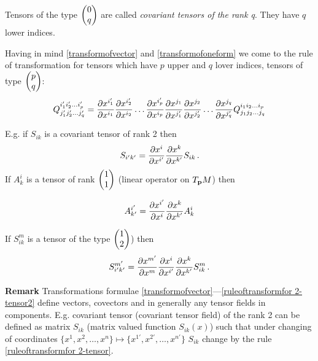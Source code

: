 \documentclass[12pt]{article}
\theoremstyle{theorem}
\numberwithin{equation}{section}
\begin{document}
Tensors of the type $\begin{pmatrix} 0\cr q\cr\end{pmatrix}$ are called
{\it covariant tensors of the rank q}.
They have $q$ lower indices.

Having in mind \eqref{transformofvector} and
\eqref{transformofoneform} we come  to
the rule of transformation for tensors
which have $p$ upper and $q$ lover indices, tensors
of type  $\begin{pmatrix} p\cr q\cr\end{pmatrix}$:
\begin{equation}\label{ruleoftransformationofarbitrarytensors}
    Q^{i'_1i'_2\dots i'_p}_{j'_1j'_2\dots j'_q}=
    {\partial x^{i'_1}\over \partial x^{i_1}}
    {\partial x^{i'_2}\over \partial x^{i_2}}
    \dots
    {\partial x^{i'_p}\over \partial x^{i_p}}
    {\partial x^{j_1}\over \partial x^{j'_1}}
    {\partial x^{j_2}\over \partial x^{j'_2}}
    \dots
    {\partial x^{j_q}\over \partial x^{j'_q}}
    Q^{i_1i_2\dots i_p}_{j_1j_2\dots j_q}
\end{equation}



E.g. if $S_{ik}$ is a covariant tensor
of rank 2 then
            \begin{equation*}\label{ruleoftransformfor 2-tensor}
                S_{i'k'}=
   {\partial x^i\over \partial x^{i'}}
   {\partial x^k\over \partial x^{k'}}
             S_{ik}\,.
            \end{equation*}
 If $A^i_k$ is a tensor of rank $\begin{pmatrix} 1\cr 1\cr\end{pmatrix}$ (linear operator on $T_{\bf p} M$)
 then

             $$
    A^{i'}_{k'}=        {\partial x^{i'}\over \partial x^{i}}{\partial x^k\over \partial x^{k'}}A^i_k
             $$

If $S^m_{ik}$ is a
tensor of the type $\begin{pmatrix} 1\cr 2\cr\end{pmatrix}$) then
            \begin{equation}\label{ruleoftransformfor 2-tensor2}
                S^{m'}_{i'k'}=
   {\partial x^{m'}\over \partial x^m}
   {\partial x^i\over \partial x^{i'}}
   {\partial x^k\over \partial x^{k'}}
             S^{m}_{ik}\,.
            \end{equation}





{\bf Remark} Transformations formulae
\eqref{transformofvector}---\eqref{ruleoftransformfor 2-tensor2}  define
vectors, covectors and in generally any tensor fields in components. E.g. covariant tensor (covariant tensor field)
of the rank 2 can be defined as matrix $S_{ik}$ (matrix valued function $S_{ik}(x)$) such that
under changing of coordinates $\{x^1,x^2,\dots,x^n\}\mapsto \{x^{1'},x^{2'},\dots,x^{n'}\}$
 $S_{ik}$ change by the rule \eqref{ruleoftransformfor 2-tensor}.
\end{document}
